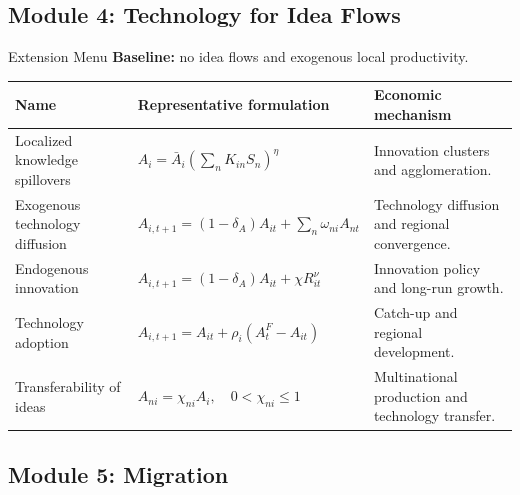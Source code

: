 \documentclass[aspectratio=169,11pt]{beamer}
\newcommand{\B}[1]{\textcolor{blue1}{\textbf{#1}}}
\begin{document}
\subsection{Module 4: Technology for Idea Flows}

\begin{frame}{Extension Menu}
  \scriptsize
  \setlength{\tabcolsep}{3pt}
  \B{Baseline:} no idea flows and exogenous local productivity.

  \smallskip
  \renewcommand{\arraystretch}{1.14}
  \begin{center}
  \begin{tabular}{
    >{\raggedright\arraybackslash}p{}
    >{\centering\arraybackslash}p{}
    >{\raggedright\arraybackslash}p{}}
    \toprule
    Name & Representative formulation & Economic mechanism \\
    \midrule
    Localized knowledge spillovers
      & \(\displaystyle
          A_i=\bar A_i\left(\sum_nK_{in}S_n\right)^\eta\)
      & Innovation clusters and agglomeration. \\
    \addlinespace[2pt]
    Exogenous technology diffusion
      & \(\displaystyle
          A_{i,t+1}=(1-\delta_A)A_{it}
          +\sum_n\omega_{ni}A_{nt}\)
      & Technology diffusion and regional convergence. \\
    \addlinespace[2pt]
    Endogenous innovation
      & \(\displaystyle
          A_{i,t+1}=(1-\delta_A)A_{it}+\chi R_{it}^{\nu}\)
      & Innovation policy and long-run growth. \\
    \addlinespace[2pt]
    Technology adoption
      & \(\displaystyle
          A_{i,t+1}=A_{it}+\rho_i(A_t^F-A_{it})\)
      & Catch-up and regional development. \\
    \addlinespace[2pt]
    Transferability of ideas
      & \(\displaystyle
          A_{ni}=\chi_{ni}A_i,\quad0<\chi_{ni}\leq1\)
      & Multinational production and technology transfer. \\
    \bottomrule
  \end{tabular}
  \end{center}
\end{frame}

\subsection{Module 5: Migration}
\end{document}
